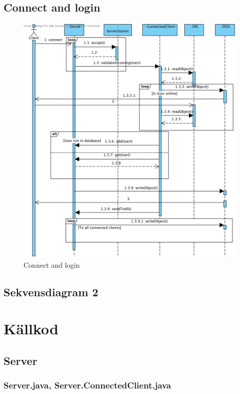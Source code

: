 \documentclass[a4paper,11pt]{article}
\begin{document}
\subsection{Connect and login}
	\begin{figure}[H]
		\centering
		\includegraphics[width=\textwidth]{diagram/Server_ConnectAndLogin.png}
		\caption{Connect and login}
	\end{figure}


\subsection{Sekvensdiagram 2}

\section{Källkod}

	\subsection{Server}
		\subsubsection{Server.java, Server.ConnectedClient.java}
		
\end{document}
